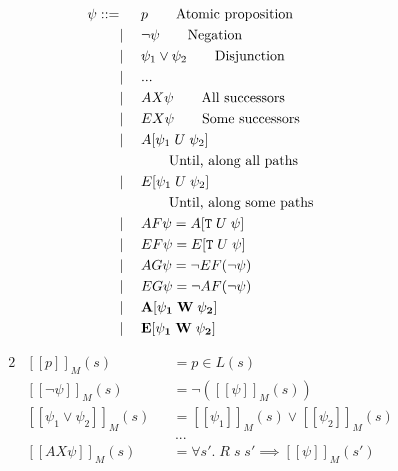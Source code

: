 \documentclass[a4paper, 11pt]{article}
\newcommand{\interp}[2][]{\mathcal{#1}[\![#2]\!]}
\begin{document}
{{        \vspace{-8mm}
        \hspace{-7mm}
        \begin{minipage}[t]{0.35\textwidth}
        \begin{alignat*}{2}
        \psi ::=& \; &\;& p \tag*{Atomic proposition} \\
                & | && \neg \psi \tag*{Negation} \\
                & | && \psi_1 \vee \psi_2 \tag*{Disjunction} \\
                & | && ... \\
                & | && AX\psi \tag*{All successors} \\
                & | && EX\psi \tag*{Some successors} \\
                & | && A[\psi_1\;U\;\psi_2] \\
                &   && \tag*{Until, along all paths} \\
                & | && E[\psi_1\;U\;\psi_2] \\
                &   && \tag*{Until, along some paths} \\
                & | && AF\psi = A[\texttt{T}\;U\;\psi] \\
                & | && EF\psi = E[\texttt{T}\;U\;\psi] \\
                & | && AG\psi = \neg EF(\neg\psi) \\
                & | && EG\psi = \neg AF(\neg\psi) \\
                & | && \bf{A[\psi_1\;W\;\psi_2]} \\
                & | && \bf{E[\psi_1\;W\;\psi_2]}
        \end{alignat*}
        \end{minipage}
        \hspace{4mm}
        \begin{minipage}[t]{0.7\textwidth}
        \begin{alignat*}{2}
        &\interp{p}_M(s)                    &&= p \in L(s) \\
        &\interp{\neg \psi}_M(s)            &&= \neg(\interp{\psi}_M(s)) \\
        &\interp{\psi_1 \vee \psi_2}_M(s)   &&= \interp{\psi_1}_M(s) \vee \interp{\psi_2}_M(s) \\
        &                                   &&\,... \\
        &\interp{AX\psi}_M(s)               &&= \forall s'.\; R\;s\;s' \implies \interp{\psi}_M(s') \\

\end{alignat*}
\end{minipage}}}
\end{document}
